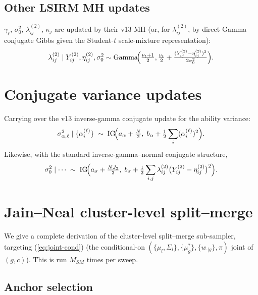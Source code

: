 \documentclass[11pt]{article}
\newcommand{\IG}{\mathrm{IG}}
\begin{document}
\subsection{Other LSIRM MH updates}
$\gamma_\ell$, $\sigma_0^2$, $\lambda_{ij}^{(2)}$, $\kappa_j$ are
updated by their v13 MH (or, for $\lambda_{ij}^{(2)}$, by direct
Gamma conjugate Gibbs given the Student-$t$ scale-mixture
representation):
\begin{equation}
\lambda_{ij}^{(2)}\mid Y_{ij}^{(2)},\eta_{ij}^{(2)},\sigma_0^2 \sim
\mathrm{Gamma}\!\Bigl(\tfrac{\nu_t+1}{2},
\tfrac{\nu_t}{2}+\tfrac{(Y_{ij}^{(2)}-\eta_{ij}^{(2)})^2}{2\sigma_0^2}\Bigr).
\label{eq:lambda-update}
\end{equation}

\section{Conjugate variance updates}
\label{sec:varupd}

Carrying over the v13 inverse-gamma conjugate update for the
ability variance:
\begin{equation}
\sigma_{\alpha,\ell}^2\mid\{\alpha_i^{(\ell)}\} \;\sim\;
\IG\!\Bigl(a_\alpha+\tfrac{N}{2},\;
   b_\alpha+\tfrac12\sum_i (\alpha_i^{(\ell)})^2\Bigr).
\label{eq:sigalpha-update}
\end{equation}
Likewise, with the standard inverse-gamma--normal conjugate structure,
\begin{equation}
\sigma_0^2\mid\cdots \;\sim\;
\IG\!\Bigl(a_\sigma+\tfrac{NJ_2}{2},\;
   b_\sigma+\tfrac12\sum_{i,j}\lambda_{ij}^{(2)}\bigl(Y_{ij}^{(2)}-\eta_{ij}^{(2)}\bigr)^2\Bigr).
\label{eq:sig0-update}
\end{equation}

\section{Jain--Neal cluster-level split--merge}
\label{sec:jainneal}

We give a complete derivation of the cluster-level split--merge
sub-sampler, targeting (\ref{eq:joint-cond}) (the conditional-on
$(\{\mu_l,\Sigma_l\},\{\mu_g^*\},\{w_{\cdot|g}\},\pi)$ joint of $(g,c)$).
This is run $M_{SM}$ times per sweep.

\subsection{Anchor selection}
\end{document}
